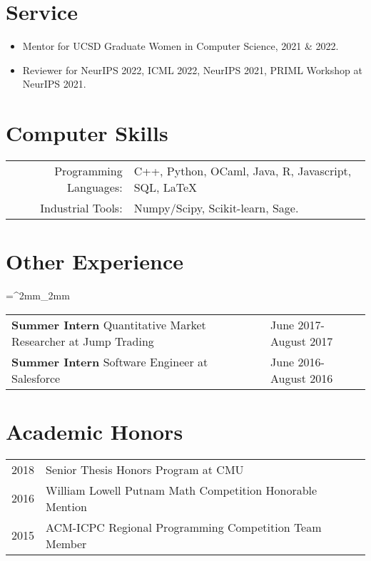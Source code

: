 \documentclass[11pt]{article}
\begin{document}
\section*{Service}
\begin{itemize}
	\item Mentor for UCSD Graduate Women in Computer Science, 2021 \& 2022.
	\item Reviewer for NeurIPS 2022, ICML 2022, NeurIPS 2021, PRIML Workshop at NeurIPS 2021.
\end{itemize}

\section*{Computer Skills}
\begin{tabular}{rl}
  Programming Languages: & C++, Python, OCaml, Java, R, Javascript, SQL, \LaTeX \\
  Industrial Tools: & Numpy/Scipy, Scikit-learn, Sage.
\end{tabular}


\section*{Other Experience}
\tabulinesep=^2mm_2mm
\begin{tabu}{X[4,l] X[1,l]}
	\textbf{Summer Intern} \newline
    Quantitative Market Researcher at Jump Trading
  & June 2017-August 2017 \\
	\textbf{Summer Intern} \newline
    Software Engineer at Salesforce
  & June 2016-August 2016 \\
\end{tabu}

\section*{Academic Honors}

\begin{tabular}{rl}
  2018 & Senior Thesis Honors Program at CMU \\
  2016 & William Lowell Putnam Math Competition Honorable Mention \\
  2015 & ACM-ICPC Regional Programming Competition Team Member
\end{tabular}
\end{document}

